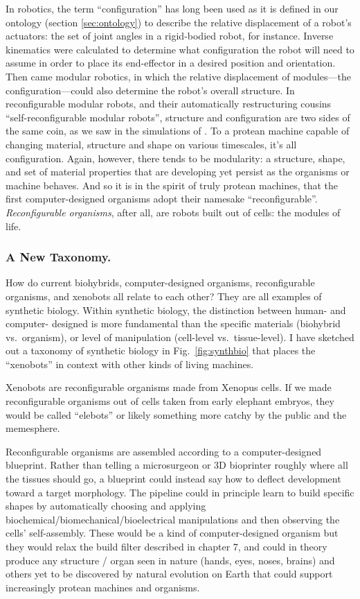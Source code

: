 In robotics, the term ``configuration'' has long been used
as it is defined in our ontology (section \ref{sec:ontology})
to describe the relative displacement of a robot's actuators: the set of joint angles in a rigid-bodied robot, for instance.
Inverse kinematics were calculated to determine what configuration the robot will need to assume in order to 
place its end-effector in a desired position and orientation.
Then came modular robotics, in which the relative displacement of modules---the configuration---could also determine the robot's overall structure.
In reconfigurable modular robots, and their automatically restructuring cousins ``self-reconfigurable modular robots'', structure and configuration are two sides of the same coin, as we saw in the simulations of \citet{pathak2019learning}.
To a protean machine capable of changing material, structure and shape on various timescales,
it's all configuration.
Again, however, there tends to be modularity:
a structure, shape, and set of material properties that are developing yet persist as the organisms or machine behaves.
And so it is in the spirit of truly protean machines,
that the first computer-designed organisms
adopt their namesake ``reconfigurable''.
\textit{Reconfigurable organisms}, after all, are
robots built out of cells: the modules of life.


\subsubsection{A New Taxonomy.}

How do current biohybrids,
computer-designed organisms,
reconfigurable organisms,
and xenobots
all relate to each other?
They are all examples of synthetic biology.
Within synthetic biology, the distinction between human- and computer- designed is more fundamental than the specific materials (biohybrid vs.~organism),
or level of manipulation (cell-level vs.~tissue-level).
I have sketched out a taxonomy of synthetic biology in  Fig.~\ref{fig:synthbio} that places the ``xenobots'' in context with other kinds of living machines.

Xenobots are reconfigurable organisms made from Xenopus cells.
If we made reconfigurable organisms out of cells taken from early elephant embryos, they would be called ``elebots'' or likely something more catchy by the public and the memesphere.

Reconfigurable organisms are assembled according to a computer-designed blueprint.
Rather than telling a microsurgeon or 3D bioprinter roughly where all the tissues should go, 
a blueprint could instead say how to deflect development toward a target morphology.
The pipeline could in principle learn to build specific shapes by automatically choosing and applying biochemical/biomechanical/bioelectrical
manipulations and then observing the cells' self-assembly.
These would be a kind of computer-designed organism but they would relax the build filter described in chapter 7, and could in theory produce any structure / organ seen in nature (hands, eyes, noses, brains) and others yet to be discovered by natural evolution on Earth that could support increasingly protean machines and organisms.


